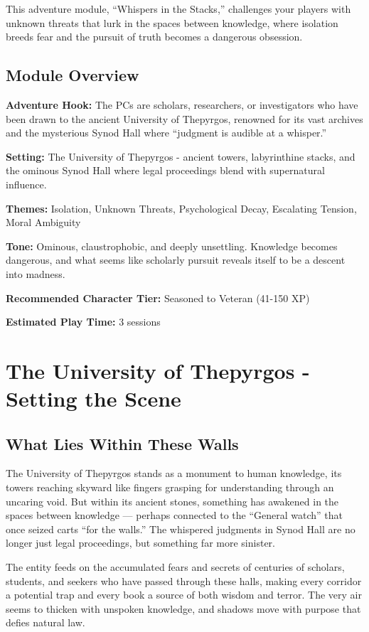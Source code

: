 \documentclass[11pt]{article}
\begin{document}
This adventure module, ``Whispers in the Stacks,'' challenges your players with unknown threats that lurk in the spaces between knowledge, where isolation breeds fear and the pursuit of truth becomes a dangerous obsession.

\subsection{Module Overview}

\textbf{Adventure Hook:} The PCs are scholars, researchers, or investigators who have been drawn to the ancient University of Thepyrgos, renowned for its vast archives and the mysterious Synod Hall where ``judgment is audible at a whisper.''

\textbf{Setting:} The University of Thepyrgos - ancient towers, labyrinthine stacks, and the ominous Synod Hall where legal proceedings blend with supernatural influence.

\textbf{Themes:} Isolation, Unknown Threats, Psychological Decay, Escalating Tension, Moral Ambiguity

\textbf{Tone:} Ominous, claustrophobic, and deeply unsettling. Knowledge becomes dangerous, and what seems like scholarly pursuit reveals itself to be a descent into madness.

\textbf{Recommended Character Tier:} Seasoned to Veteran (41-150 XP)

\textbf{Estimated Play Time:} 3 sessions

\section{The University of Thepyrgos - Setting the Scene}

\subsection{What Lies Within These Walls}

The University of Thepyrgos stands as a monument to human knowledge, its towers reaching skyward like fingers grasping for understanding through an uncaring void. But within its ancient stones, something has awakened in the spaces between knowledge --- perhaps connected to the ``General watch'' that once seized carts ``for the walls.'' The whispered judgments in Synod Hall are no longer just legal proceedings, but something far more sinister.

The entity feeds on the accumulated fears and secrets of centuries of scholars, students, and seekers who have passed through these halls, making every corridor a potential trap and every book a source of both wisdom and terror. The very air seems to thicken with unspoken knowledge, and shadows move with purpose that defies natural law.
\end{document}
